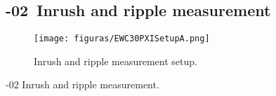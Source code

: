\setcounter{Sec}{0}\setcounter{Step}{0}

\newpage
\renewcommand{\subprocid}{{\procid}-02}

\newpage
\subsection{\subprocid \ Inrush and ripple measurement }


\begin{figure}[H]
	\centering
	  \texttt{[image: figuras/EWC30PXISetupA.png]}  
	  \caption{Inrush and ripple measurement setup.}
	\label{fig:setup_xband_funcional_ripple}
	\end{figure}
\newpage
\begin{stepstable}{\subprocid{} Inrush and ripple measurement.}
	\ExecutorRecord

		\RegisterTempAndHumidity

		\DisablePowerSupplyOutput
		\TurnOffMainSwitch
		\PowerOffPxi	
	
		\DisconnectHarnessFromEMIEMCFilterOutput{\NuevoHarnessDos}
		\ConnectHarnessToEMIEMCFilterOutput{\NuevoHarnessCuatro} %

        







		\TurnOnMainSwitch
		\EnablePowerSupplyOutput
		\PowerOnPxi


\end{stepstable}
